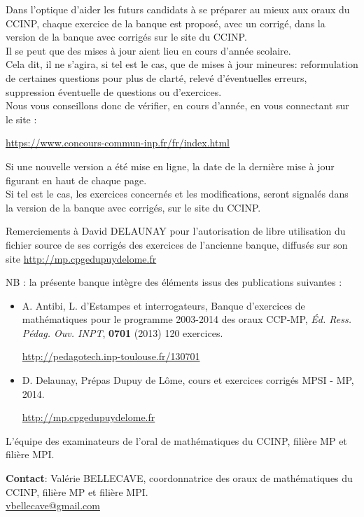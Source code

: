 \documentclass[10pt,oneside]{article}
\begin{document}
\begin{flushleft}
\bigskip
Dans l'optique d'aider les futurs candidats à se préparer au mieux aux oraux du CCINP, chaque exercice de la banque  est proposé,  avec un corrigé, dans la version de la banque avec corrigés sur le site du CCINP.\\
\bigskip
Il se peut que des mises à jour aient lieu en cours d'année scolaire.\\
Cela dit, il ne s'agira, si tel est le cas, que de mises à jour mineures: reformulation de certaines questions pour plus de clarté, relevé d'éventuelles erreurs, suppression éventuelle de questions ou d'exercices.\\
Nous vous conseillons donc de vérifier, en cours d'année, en vous
connectant sur le site : 
\centerline{\url{https://www.concours-commun-inp.fr/fr/index.html}}
 Si une nouvelle version a été mise en ligne, la date de la dernière
 mise à jour figurant en haut  de chaque page.\\
Si tel est le cas, les exercices concernés et les modifications, seront signalés dans la version de la banque avec corrigés, sur le site du CCINP.

\bigskip
Remerciements à David DELAUNAY pour l'autorisation de libre utilisation du
fichier source de ses corrigés des exercices de l'ancienne banque, 
diffusés sur son site \url{http://mp.cpgedupuydelome.fr}

\vspace{1cm}
NB : la pr\'esente banque intègre des éléments issus des publications
suivantes :
\medskip
\begin{itemize}
\item[$\bullet$]
A. Antibi, L. d'Estampes et interrogateurs, Banque d'exercices de
mathématiques pour le programme 2003-2014 des oraux CCP-MP, {\it
  Éd. Ress. Pédag. Ouv. INPT}, {\bf 0701} (2013) 120 exercices.

\centerline{\url{http://pedagotech.inp-toulouse.fr/130701}}


\item[$\bullet$]
D. Delaunay, Prépas Dupuy de Lôme, cours et exercices corrigés MPSI -
MP, 2014.
\centerline{\url{http://mp.cpgedupuydelome.fr}}



\end{itemize}



\vspace{2cm}
\begin{flushright}
L'équipe des examinateurs de l'oral de mathématiques du CCINP, filière MP et filière MPI.
\end{flushright}

\vspace{.4cm}

\hfill
\begin{minipage}{0.45\textwidth}
\textbf{Contact}: {Valérie BELLECAVE, coordonnatrice des oraux
  de mathématiques du CCINP, filière MP et filière MPI.}
\\
\null\hfill \href{mailto:vbellecave@gmail.com}{vbellecave@gmail.com}
\end{minipage}


\end{flushleft}
\end{document}
